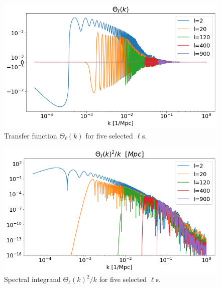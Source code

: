 \documentclass[10pt, a4paper]{article}
\begin{document}
\begin{figure}[H]
    \centering
    \includegraphics[scale=0.5]{../m4_figs/Theta.png}
    \caption{Transfer function $\Theta_\ell(k)$ for five selected $\ell$s.}
    \label{fig:Theta}
\end{figure}

\begin{figure}[H]
    \centering
    \includegraphics[scale=0.5]{../m4_figs/Theta2.png}
    \caption{Spectral integrand $\Theta_\ell(k)^2/k$ for five selected $\ell$s.}
    \label{fig:Theta2}
\end{figure}



\newpage


\end{document}
